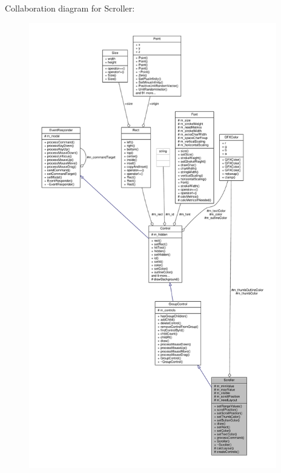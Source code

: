 Collaboration diagram for Scroller\+:
\nopagebreak
\begin{figure}[H]
\begin{center}
\leavevmode
\includegraphics[height=550pt]{d4/dae/classScroller__coll__graph}
\end{center}
\end{figure}
